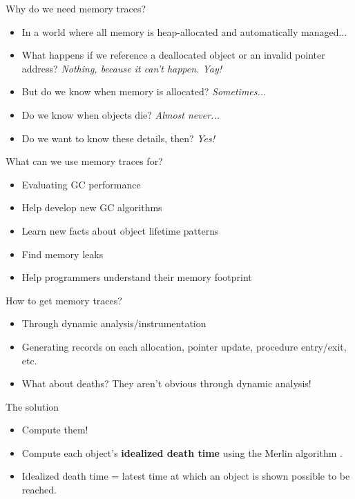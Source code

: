 \documentclass[11pt]{beamer}
\begin{document}
\begin{frame}{Why do we need memory traces?}
  \begin{itemize}
  \item In a world where all memory is heap-allocated and automatically managed...
    \pause
  \item What happens if we reference a deallocated object or an invalid pointer
    address? \pause \textit{Nothing, because it can't happen. Yay!}\pause
  \item But do we know when memory is allocated? \pause
    \textit{Sometimes...}\pause
  \item Do we know when objects die? \pause \textit{Almost never...} \pause
  \item Do we want to know these details, then? \pause \textit{Yes!}
  \end{itemize}
  
\end{frame}

\begin{frame}{What can we use memory traces for?}
  \begin{itemize}
  \item Evaluating GC performance
  \item Help develop new GC algorithms
  \item Learn new facts about object lifetime patterns \citep{Garbology}
  \item Find memory leaks \citep{MemInsight}
  \item Help programmers understand their memory footprint
  \end{itemize}
\end{frame}

\begin{frame}{How to get memory traces?}
  \begin{itemize}
  \item Through dynamic analysis/instrumentation
    \pause
  \item Generating records on each allocation, pointer update, procedure entry/exit, etc.
    \pause
  \item What about deaths? They aren't obvious through dynamic analysis!
  \end{itemize}
\end{frame}

\begin{frame}{The solution}
  \begin{itemize}
  \item Compute them!
    \pause
  \item Compute each object's \textbf{idealized death time} using the Merlin algorithm 
    \citep{Merlin, MerlinSIGMETRICS}.
    \pause
  \item Idealized death time = latest time at which an object is shown possible to be reached.
  \end{itemize}
\end{frame}
\end{document}
